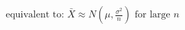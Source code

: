 \documentclass[preview]{standalone}
\begin{document}
\begin{align*}
\text{equivalent to: } \bar{X} \approx N\left(\mu, \frac{\sigma^2}{n}\right) \text{ for large } n
\end{align*}
\end{document}

